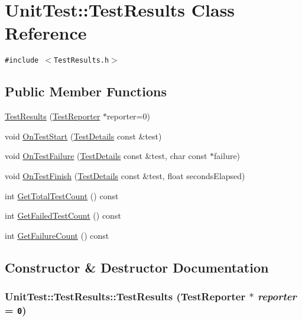 \hypertarget{class_unit_test_1_1_test_results}{
\section{UnitTest::TestResults Class Reference}
\label{class_unit_test_1_1_test_results}
}
{\tt \#include $<$TestResults.h$>$}

\subsection*{Public Member Functions}
\begin{CompactItemize}
\item 
\hyperlink{class_unit_test_1_1_test_results_f4e4405017e0c8e5dd8cca212adf049b}{TestResults} (\hyperlink{class_unit_test_1_1_test_reporter}{TestReporter} $\ast$reporter=0)
\item 
void \hyperlink{class_unit_test_1_1_test_results_d37dd4b529bbdcd83f6c48e9140a6007}{OnTestStart} (\hyperlink{class_unit_test_1_1_test_details}{TestDetails} const \&test)
\item 
void \hyperlink{class_unit_test_1_1_test_results_37dbb0baa9ba978238a4ba7c2a89b53c}{OnTestFailure} (\hyperlink{class_unit_test_1_1_test_details}{TestDetails} const \&test, char const $\ast$failure)
\item 
void \hyperlink{class_unit_test_1_1_test_results_0b35af87ce16d6064bc3cef5b6d85d0f}{OnTestFinish} (\hyperlink{class_unit_test_1_1_test_details}{TestDetails} const \&test, float secondsElapsed)
\item 
int \hyperlink{class_unit_test_1_1_test_results_01c7d08d38520aabddbb31acccaf6269}{GetTotalTestCount} () const 
\item 
int \hyperlink{class_unit_test_1_1_test_results_b1a492236db33a8a00a1c0048bbe32de}{GetFailedTestCount} () const 
\item 
int \hyperlink{class_unit_test_1_1_test_results_008043809cf05629adf8bbeb1492a821}{GetFailureCount} () const 
\end{CompactItemize}


\subsection{Constructor \& Destructor Documentation}
\hypertarget{class_unit_test_1_1_test_results_f4e4405017e0c8e5dd8cca212adf049b}{
\subsubsection[{TestResults}]{\setlength{\rightskip}{0pt plus 5cm}UnitTest::TestResults::TestResults ({\bf TestReporter} $\ast$ {\em reporter} = {\tt 0})}}
\label{class_unit_test_1_1_test_results_f4e4405017e0c8e5dd8cca212adf049b}




